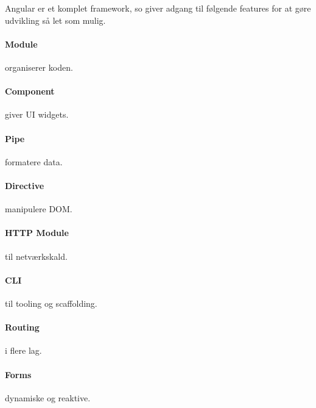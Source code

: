 Angular er et komplet framework, so giver adgang til følgende features for at gøre udvikling så let som mulig.

\begin{multicols}{2}
\paragraph{Module} organiserer koden.
\paragraph{Component} giver UI widgets.
\paragraph{Pipe} formatere data.
\paragraph{Directive} manipulere DOM.
\paragraph{HTTP Module} til netværkskald.
\paragraph{CLI} til tooling og scaffolding.
\paragraph{Routing} i flere lag.
\paragraph{Forms} dynamiske og reaktive.
\end{multicols}